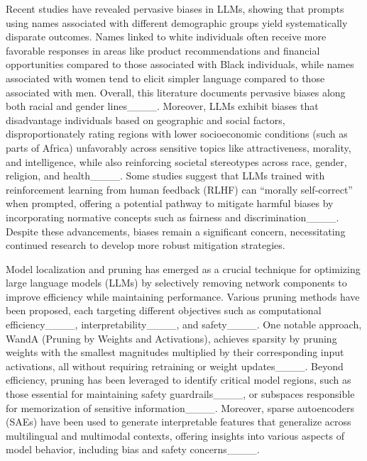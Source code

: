 Recent studies have revealed pervasive biases in LLMs, showing that prompts using names associated with different demographic groups yield systematically disparate outcomes. Names linked to white individuals often receive more favorable responses in areas like product recommendations and financial opportunities compared to those associated with Black individuals, while names associated with women tend to elicit simpler language compared to those associated with men. Overall, this literature documents pervasive biases along both racial and gender lines____. Moreover, LLMs exhibit biases that disadvantage individuals based on geographic and social factors, disproportionately rating regions with lower socioeconomic conditions (such as parts of Africa) unfavorably across sensitive topics like attractiveness, morality, and intelligence, while also reinforcing societal stereotypes across race, gender, religion, and health____. Some studies suggest that LLMs trained with reinforcement learning from human feedback (RLHF) can “morally self-correct” when prompted, offering a potential pathway to mitigate harmful biases by incorporating normative concepts such as fairness and discrimination____. Despite these advancements, biases remain a significant concern, necessitating continued research to develop more robust mitigation strategies.

Model localization and pruning has emerged as a crucial technique for optimizing large language models (LLMs) by selectively removing network components to improve efficiency while maintaining performance. Various pruning methods have been proposed, each targeting different objectives such as computational efficiency____, interpretability____, and safety____. One notable approach, WandA (Pruning by Weights and Activations), achieves sparsity by pruning weights with the smallest magnitudes multiplied by their corresponding input activations, all without requiring retraining or weight updates____. Beyond efficiency, pruning has been leveraged to identify critical model regions, such as those essential for maintaining safety guardrails____, or subspaces responsible for memorization of sensitive information____. Moreover, sparse autoencoders (SAEs) have been used to generate interpretable features that generalize across multilingual and multimodal contexts, offering insights into various aspects of model behavior, including bias and safety concerns____.

